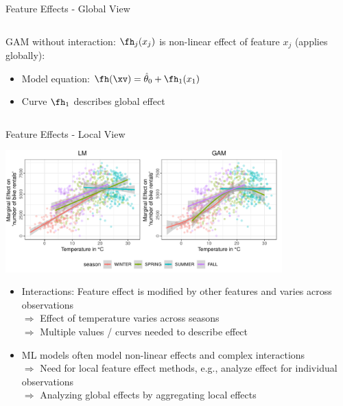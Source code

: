\documentclass[11pt,compress,t,notes=noshow, aspectratio=169, xcolor=table]{beamer}
\begin{document}
\begin{frame}{Feature Effects - Global View}
\begin{columns}[T, totalwidth=\textwidth]
\begin{column}{0.49\linewidth}
\bigskip
GAM without interaction: $\fh_j(x_j)$ is non-linear effect of feature $x_j$  (applies globally):
\begin{itemize}
    \item Model equation: $\fh(\xv) = \hat\theta_0 + \fh_1(x_1)$
    \item Curve $\fh_1$ describes global effect
\end{itemize}
\end{column}
\end{columns}

\end{frame}


\begin{frame}{Feature Effects - Local View}

\centerline{\includegraphics[width=0.8\textwidth, trim=0cm 0.1cm 0cm 0cm, clip]{figure/lm_main_interactions}}

\begin{itemize}
    \item Interactions: Feature effect is modified by other features and varies across observations \\ 
    $\Rightarrow$ Effect of temperature varies across seasons\\
    $\Rightarrow$ Multiple values / curves needed to describe effect
    \item ML models often model non-linear effects and complex interactions \\
    $\Rightarrow$ Need for local feature effect methods, e.g., analyze effect for individual observations\\
    $\Rightarrow$ Analyzing global effects by aggregating local effects
\end{itemize}

\end{frame}
\end{document}
